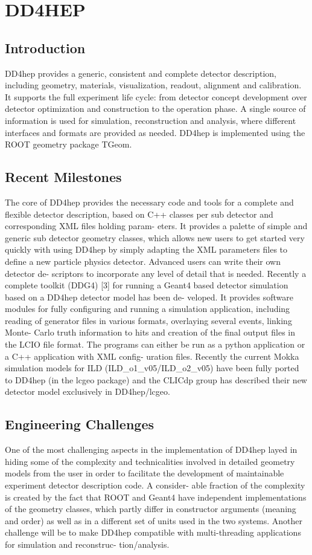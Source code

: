 \section{DD4HEP}

\subsection{Introduction}
DD4hep provides a generic, consistent and complete detector description, including geometry, materials, visualization, readout, alignment and calibration. It supports the full experiment life cycle: from detector concept development over detector optimization and construction to the operation phase. A single source of information is used for simulation, reconstruction and analysis, where different interfaces and formats are provided as needed. DD4hep is implemented using the ROOT geometry package TGeom.

\subsection{Recent Milestones}
The core of DD4hep provides the necessary code and tools for a complete and flexible detector description, based on C++ classes per sub detector and corresponding XML files holding param- eters. It provides a palette of simple and generic sub detector geometry classes, which allows new users to get started very quickly with using DD4hep by simply adapting the XML parameters files to define a new particle physics detector. Advanced users can write their own detector de- scriptors to incorporate any level of detail that is needed. Recently a complete toolkit (DDG4) [3] for running a Geant4 based detector simulation based on a DD4hep detector model has been de- veloped. It provides software modules for fully configuring and running a simulation application, including reading of generator files in various formats, overlaying several events, linking Monte- Carlo truth information to hits and creation of the final output files in the LCIO file format. The programs can either be run as a python application or a C++ application with XML config- uration files. Recently the current Mokka simulation models for ILD (ILD\_o1\_v05/ILD\_o2\_v05) have been fully ported to DD4hep (in the lcgeo package) and the CLICdp group has described their new detector model exclusively in DD4hep/lcgeo.

\subsection{Engineering Challenges}
One of the most challenging aspects in the implementation of DD4hep layed in hiding some of the complexity and technicalities involved in detailed geometry models from the user in order to facilitate the development of maintainable experiment detector description code. A consider- able fraction of the complexity is created by the fact that ROOT and Geant4 have independent implementations of the geometry classes, which partly differ in constructor arguments (meaning and order) as well as in a different set of units used in the two systems. Another challenge will be to make DD4hep compatible with multi-threading applications for simulation and reconstruc- tion/analysis.

